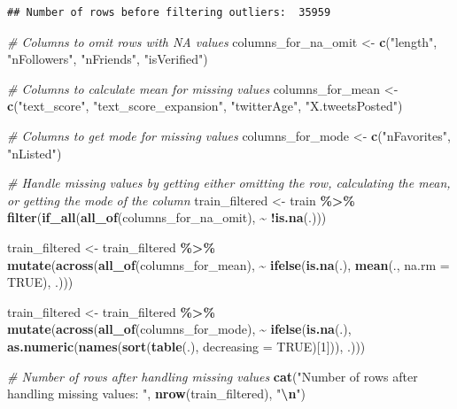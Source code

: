 \documentclass[
]{article}
\newenvironment{Shaded}{\begin{snugshade}}{\end{snugshade}}
\newcommand{\AttributeTok}[1]{\textcolor[rgb]{0.13,0.29,0.53}{#1}}
\newcommand{\CommentTok}[1]{\textcolor[rgb]{0.56,0.35,0.01}{\textit{#1}}}
\newcommand{\ConstantTok}[1]{\textcolor[rgb]{0.56,0.35,0.01}{#1}}
\newcommand{\DecValTok}[1]{\textcolor[rgb]{0.00,0.00,0.81}{#1}}
\newcommand{\FunctionTok}[1]{\textcolor[rgb]{0.13,0.29,0.53}{\textbf{#1}}}
\newcommand{\NormalTok}[1]{#1}
\newcommand{\OtherTok}[1]{\textcolor[rgb]{0.56,0.35,0.01}{#1}}
\newcommand{\SpecialCharTok}[1]{\textcolor[rgb]{0.81,0.36,0.00}{\textbf{#1}}}
\newcommand{\StringTok}[1]{\textcolor[rgb]{0.31,0.60,0.02}{#1}}
\begin{document}
\begin{verbatim}
## Number of rows before filtering outliers:  35959
\end{verbatim}

\begin{Shaded}
\begin{Highlighting}[]
\CommentTok{\# Columns to omit rows with NA values}
\NormalTok{columns\_for\_na\_omit }\OtherTok{\textless{}{-}} \FunctionTok{c}\NormalTok{(}\StringTok{"length"}\NormalTok{, }\StringTok{"nFollowers"}\NormalTok{, }\StringTok{"nFriends"}\NormalTok{, }\StringTok{"isVerified"}\NormalTok{)}

\CommentTok{\# Columns to calculate mean for missing values}
\NormalTok{columns\_for\_mean }\OtherTok{\textless{}{-}} \FunctionTok{c}\NormalTok{(}\StringTok{"text\_score"}\NormalTok{, }\StringTok{"text\_score\_expansion"}\NormalTok{,}
  \StringTok{"twitterAge"}\NormalTok{, }\StringTok{"X.tweetsPosted"}\NormalTok{)}

\CommentTok{\# Columns to get mode for missing values}
\NormalTok{columns\_for\_mode }\OtherTok{\textless{}{-}} \FunctionTok{c}\NormalTok{(}\StringTok{"nFavorites"}\NormalTok{, }\StringTok{"nListed"}\NormalTok{)}

\CommentTok{\# Handle missing values by getting either omitting the row, calculating the mean, or getting the mode of the column}
\NormalTok{train\_filtered }\OtherTok{\textless{}{-}}\NormalTok{ train }\SpecialCharTok{\%\textgreater{}\%}
  \FunctionTok{filter}\NormalTok{(}\FunctionTok{if\_all}\NormalTok{(}\FunctionTok{all\_of}\NormalTok{(columns\_for\_na\_omit), }\SpecialCharTok{\textasciitilde{}} \SpecialCharTok{!}\FunctionTok{is.na}\NormalTok{(.)))}

\NormalTok{train\_filtered }\OtherTok{\textless{}{-}}\NormalTok{ train\_filtered }\SpecialCharTok{\%\textgreater{}\%}
  \FunctionTok{mutate}\NormalTok{(}\FunctionTok{across}\NormalTok{(}\FunctionTok{all\_of}\NormalTok{(columns\_for\_mean),}
                \SpecialCharTok{\textasciitilde{}} \FunctionTok{ifelse}\NormalTok{(}\FunctionTok{is.na}\NormalTok{(.), }\FunctionTok{mean}\NormalTok{(., }\AttributeTok{na.rm =} \ConstantTok{TRUE}\NormalTok{), .)))}

\NormalTok{train\_filtered }\OtherTok{\textless{}{-}}\NormalTok{ train\_filtered }\SpecialCharTok{\%\textgreater{}\%}
  \FunctionTok{mutate}\NormalTok{(}\FunctionTok{across}\NormalTok{(}\FunctionTok{all\_of}\NormalTok{(columns\_for\_mode),}
                \SpecialCharTok{\textasciitilde{}} \FunctionTok{ifelse}\NormalTok{(}\FunctionTok{is.na}\NormalTok{(.), }\FunctionTok{as.numeric}\NormalTok{(}\FunctionTok{names}\NormalTok{(}\FunctionTok{sort}\NormalTok{(}\FunctionTok{table}\NormalTok{(.), }\AttributeTok{decreasing =} \ConstantTok{TRUE}\NormalTok{)[}\DecValTok{1}\NormalTok{])), .)))}

\CommentTok{\# Number of rows after handling missing values}
\FunctionTok{cat}\NormalTok{(}\StringTok{"Number of rows after handling missing values: "}\NormalTok{, }\FunctionTok{nrow}\NormalTok{(train\_filtered), }\StringTok{"}\SpecialCharTok{\textbackslash{}n}\StringTok{"}\NormalTok{)}
\end{Highlighting}
\end{Shaded}
\end{document}
